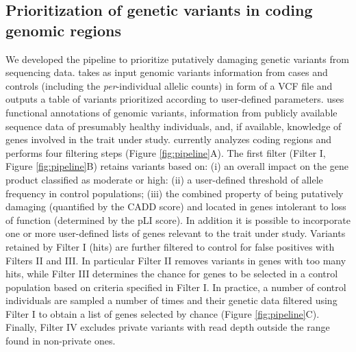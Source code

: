 \subsection*{Prioritization of genetic variants in coding genomic regions} 
We developed the \gp pipeline to prioritize putatively damaging genetic variants from sequencing data. \gp takes as input genomic variants information from cases and controls (including the \emph{per}-individual allelic counts) in form of a VCF file and outputs a table of variants prioritized according to user-defined parameters. \gp uses functional annotations of genomic variants, information from publicly available sequence data of presumably healthy individuals, and, if available, knowledge of genes involved in the trait under study. \gp currently analyzes coding regions and performs four filtering steps (Figure \ref{fig:pipeline}A). The first filter (Filter I, Figure \ref{fig:pipeline}B) retains variants based on: (i)  an overall impact on the gene product classified as moderate or high\cite{mclaren2016ensembl}: (ii) a user-defined threshold of allele frequency in control populations; (iii) the combined property of being putatively damaging (quantified by the CADD score\cite{rentzsch2019cadd}) and located in genes intolerant to loss of function (determined by the pLI score\cite{karczewski2020mutational}). In addition it is possible to incorporate one or more user-defined lists of genes relevant to the trait under study. Variants retained by Filter I (hits) are further filtered to control for false positives with Filters II and III. In particular Filter II removes variants in genes with too many hits, while Filter III determines the chance for genes to be selected in a control population based on criteria specified in Filter I. In practice, a number of control individuals are sampled a number of times and their genetic data filtered using Filter I to obtain a list of genes selected by chance (Figure \ref{fig:pipeline}C). Finally, Filter IV excludes private variants with read depth outside the range found in non-private ones.   


